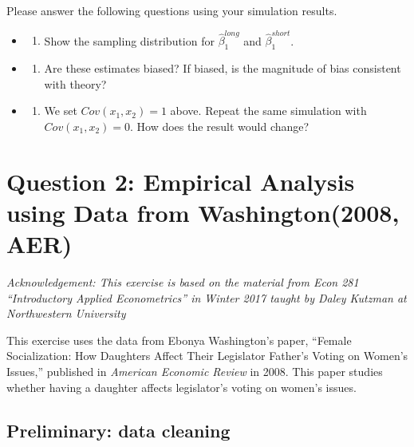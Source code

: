 \documentclass[]{book}
\providecommand{\tightlist}{%
  \setlength{\itemsep}{0pt}\setlength{\parskip}{0pt}}
\begin{document}
Please answer the following questions using your simulation results.

\begin{itemize}
\item
  \begin{enumerate}
  \def\labelenumi{(\arabic{enumi})}
  \tightlist
  \item
    Show the sampling distribution for \(\hat\beta_1^{long}\) and
    \(\hat\beta_1^{short}\).
  \end{enumerate}
\item
  \begin{enumerate}
  \def\labelenumi{(\arabic{enumi})}
  \setcounter{enumi}{1}
  \tightlist
  \item
    Are these estimates biased? If biased, is the magnitude of bias
    consistent with theory?
  \end{enumerate}
\item
  \begin{enumerate}
  \def\labelenumi{(\arabic{enumi})}
  \setcounter{enumi}{2}
  \tightlist
  \item
    We set \(Cov(x_1, x_2)=1\) above. Repeat the same simulation with
    \(Cov(x_1, x_2)=0\). How does the result would change?
  \end{enumerate}
\end{itemize}

\section{Question 2: Empirical Analysis using Data from Washington(2008,
AER)}\label{question-2-empirical-analysis-using-data-from-washington2008-aer}

\emph{Acknowledgement: This exercise is based on the material from Econ
281 ``Introductory Applied Econometrics'' in Winter 2017 taught by Daley
Kutzman at Northwestern University}

This exercise uses the data from Ebonya Washington's paper, ``Female
Socialization: How Daughters Affect Their Legislator Father's Voting on
Women's Issues,'' published in \emph{American Economic Review} in 2008.
This paper studies whether having a daughter affects legislator's voting
on women's issues.

\subsection{Preliminary: data cleaning}\label{preliminary-data-cleaning}
\end{document}
